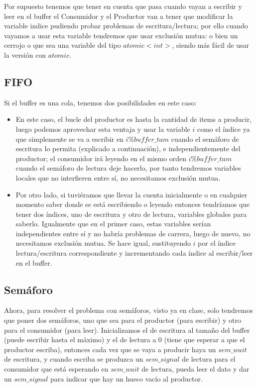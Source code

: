 \documentclass[11pt]{article}
\theoremstyle{ejercicio-style}
\begin{document}
Por supuesto tenemos que tener en cuenta que pasa cuando vayan a escribir y leer en el buffer el Consumidor y el Productor van a tener que modificar la variable indice pudiendo probar problemas de escritura/lectura; por ello cuando vayamos a usar esta variable tendremos que usar exclusión mutua: o bien un cerrojo o que sea una variable del tipo $atomic<int>$, siendo más fácil de usar la versión con $atomic$.

\subsection*{FIFO}
\label{sec::lifo}
Si el buffer es una cola, tenemos dos posibilidades en este caso:
\begin{itemize}
	\item En este caso, el bucle del productor es hasta la cantidad de items a producir, luego podemos aprovechar esta ventaja y usar la variable $i$ como el índice ya que simplemente se va a escribir en $i \% buffer\_tam$ cuando el semáforo de escritura lo permita (explicado a continuación), e independientemente del productor; el consumidor irá leyendo en el mismo orden $i \% buffer\_tam$ cuando el semáforo de lectura deje hacerlo, por tanto tendremos variables locales que no interfieren entre sí, no necesitamos exclusión mutua.
	
	\item Por otro lado, si tuviéramos que llevar la cuenta inicialmente o en cualquier momento saber donde se está escribiendo o leyendo entonces tendríamos que tener dos índices, uno de escritura y otro de lectura, variables globales para saberlo. Igualmente que en el primer caso, estas variables serían independientes entre sí y no habría problemas de carrera, luego de nuevo, no necesitamos exclusión mutua. Se hace igual, sustituyendo $i$ por el índice lectura/escritura correspondiente y incrementando cada índice al escribir/leer en el buffer.
\end{itemize}

\newpage

\subsection*{Semáforo}
\label{sec::semaforo}
Ahora, para resolver el problema con semáforos, visto ya en clase, solo tendremos que poner dos semáforos, uno que sea para el productor (para escribir) y otro para el consumidor (para leer). Inicializamos el de escritura al tamaño del buffer (puede escribir hasta el máximo) y el de lectura a 0 (tiene que esperar a que el productor escriba), entonces cada vez que se vaya a producir haya un $sem\_wait$ de escritura, y cuando escriba se produzca un $sem\_signal$ de lectura para el consumidor que está esperando en $sem\_wait$ de lectura, pueda leer el dato y dar un $sem\_signal$ para indicar que hay un hueco vacío al productor. \\
\end{document}
